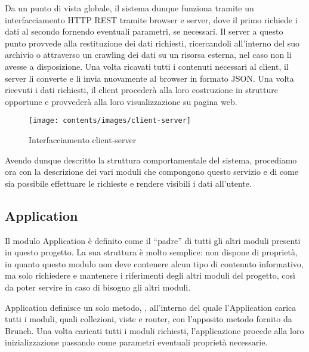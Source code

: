 Da un punto di vista globale, il sistema dunque funziona tramite un interfacciamento HTTP REST tramite browser e server, dove il primo richiede i dati al secondo fornendo eventuali parametri, se necessari. Il server a questo punto provvede alla restituzione dei dati richiesti, ricercandoli all'interno del suo archivio o attraverso un crawling dei dati su un risorsa esterna, nel caso non li avesse a disposizione.
Una volta ricavati tutti i contenuti necessari al client, il server li converte e li invia nuovamente al browser in formato JSON. Una volta ricevuti i dati richiesti, il client procederà alla loro costruzione in strutture opportune e provvederà alla loro visualizzazione su pagina web.

\vspace{1cm}
\begin{figure}[htbp]
\begin{center}
\texttt{[image: contents/images/client-server]}
\end{center}
\caption{Interfacciamento client-server}
\label{fig:classes}
\end{figure}
\vspace{1cm}

\newpage

Avendo dunque descritto la struttura comportamentale del sistema, procediamo ora con la descrizione dei vari moduli che compongono questo servizio e di come sia possibile effettuare le richieste e rendere visibili i dati all'utente.

\subsection{Application} %
\label{sub:application}

Il modulo Application è definito come il ``padre'' di tutti gli altri moduli presenti in questo progetto.
La sua struttura è molto semplice: non dispone di proprietà, in quanto questo modulo non deve contenere alcun tipo di contenuto informativo, ma solo richiedere e mantenere i riferimenti degli altri moduli del progetto, così da poter servire in caso di bisogno gli altri moduli.

Application definisce un solo metodo, , all'interno del quale l'Application carica tutti i moduli, quali collezioni, viste e router, con l'apposito metodo fornito da Brunch. Una volta caricati tutti i moduli richiesti, l'applicazione procede alla loro inizializzazione passando come parametri eventuali proprietà necessarie. 

